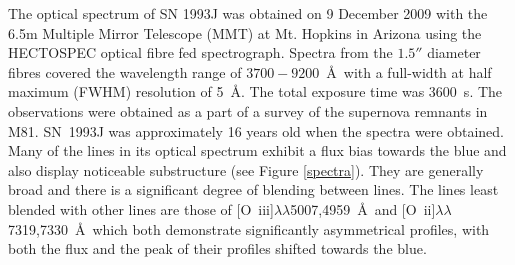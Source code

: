 The optical spectrum of SN 1993J was obtained on 9 December 2009 with the 6.5m Multiple Mirror Telescope (MMT) at Mt. Hopkins in Arizona using the HECTOSPEC optical fibre fed spectrograph. Spectra from the $1.5''$ diameter fibres covered the wavelength range of $3700-9200$~\AA\  with a full-width at half maximum (FWHM) resolution of 5~\AA.  The total exposure time was 3600~s. The observations were obtained as a part of a survey of the supernova remnants in M81.  SN~1993J was approximately 16 years old when the spectra were obtained.  Many of the lines in its optical spectrum exhibit a flux bias towards the blue and also display noticeable substructure (see Figure \ref{spectra}).  They are generally broad and  there is a significant degree of blending between lines.  The lines least blended with other lines are those of [O~{\sc iii}]$\lambda\lambda$5007,4959~\AA\ and [O~{\sc ii}]$\lambda\lambda$7319,7330~\AA\ which both demonstrate significantly asymmetrical profiles, with both the flux and the peak of their profiles shifted towards the blue.
